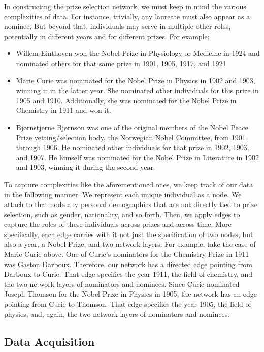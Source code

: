 \documentclass[11pt]{article}
\begin{document}
In constructing the prize selection network, we must keep in mind the various complexities of data. For instance, trivially, any laureate must also appear as a nominee. But beyond that, individuals may serve in multiple other roles, potentially in different years and for different prizes. For example:
\begin{itemize}
\item Willem Einthoven won the Nobel Prize in Physiology or Medicine in 1924 and nominated others for that same prize in 1901, 1905, 1917, and 1921.
\item Marie Curie was nominated for the Nobel Prize in Physics in 1902 and 1903, winning it in the latter year. She nominated other individuals for this prize in 1905 and 1910. Additionally, she was nominated for the Nobel Prize in Chemistry in 1911 and won it.
\item Bj{\o}rnstjerne Bj{\o}rnson was one of the original members of the Nobel Peace Prize vetting/selection body, the Norwegian Nobel Committee, from 1901 through 1906. He nominated other individuals for that prize in 1902, 1903, and 1907.  He himself was nominated for the Nobel Prize in Literature in 1902 and 1903, winning it during the second year.
\end{itemize}

To capture complexities like the aforementioned ones, we keep track of our data in the following manner. We represent each unique individual as a node. We attach to that node any personal demographics that are not directly tied to prize selection, such as gender, nationality, and so forth. Then, we apply edges to capture the roles of these individuals across prizes and across time. More specifically, each edge carries with it not just the specification of two nodes, but also a year, a Nobel Prize, and two network layers. For example, take the case of Marie Curie above. One of Curie's nominators for the Chemistry Prize in 1911 was Gaston Darboux. Therefore, our network has a directed edge pointing from Darboux to Curie. That edge specifies the year 1911, the field of chemistry, and the two network layers of nominators and nominees. Since Curie nominated Joseph Thomson for the Nobel Prize in Physics in 1905, the network has an edge pointing from Curie to Thomson. That edge specifies the year 1905, the field of physics, and, again, the two network layers of nominators and nominees.

\subsection{Data Acquisition}
\label{sec:dataacquisition}
\end{document}
